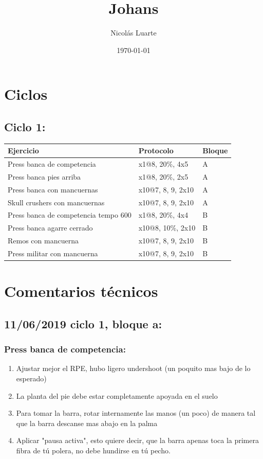 \documentclass[11pt]{article}
\author{Nicolás Luarte}
\date{\today}
\title{Johans}
\begin{document}
\maketitle
\tableofcontents

\section{Ciclos}
\label{sec:org2fdca49}
\subsection{Ciclo 1:}
\label{sec:org060a5ab}
\begin{center}
\begin{tabular}{lll}
\hline
Ejercicio & Protocolo & Bloque\\
\hline
Press banca de competencia & x1@8, 20\%, 4x5 & A\\
Press banca pies arriba & x1@8, 20\%, 2x5 & A\\
Press banca con mancuernas & x10@7, 8, 9, 2x10 & A\\
Skull crushers con mancuernas & x10@7, 8, 9, 2x10 & A\\
\hline
Press banca de competencia tempo 600 & x1@8, 20\%, 4x4 & B\\
Press banca agarre cerrado & x10@8, 10\%, 2x10 & B\\
Remos con mancuerna & x10@7, 8, 9, 2x10 & B\\
Press militar con mancuerna & x10@7, 8, 9, 2x10 & B\\
\hline
\end{tabular}
\end{center}
\section{Comentarios técnicos}
\label{sec:org16ac155}
\subsection{11/06/2019 ciclo 1, bloque a:}
\label{sec:org86f3ba4}
\subsubsection{Press banca de competencia:}
\label{sec:org3072c8b}

\begin{enumerate}
\item Ajustar mejor el RPE, hubo ligero undershoot (un poquito mas bajo
de lo esperado)
\item La planta del pie debe estar completamente apoyada en el suelo
\item Para tomar la barra, rotar internamente las manos (un poco) de
manera tal que la barra descanse mas abajo en la palma
\item Aplicar "pausa activa", esto quiere decir, que la barra apenas toca
la primera fibra de tú polera, no debe hundirse en tú pecho.
\end{enumerate}
\end{document}
